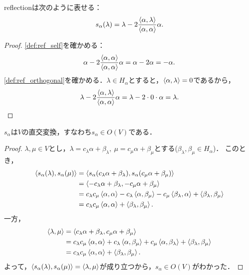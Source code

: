 \begin{proposition}
  reflectionは次のように表せる：
  \begin{equation}
    s_\alpha (\lambda) = \lambda - 2\frac{\left\langle \alpha, \lambda \right\rangle}{\left\langle \alpha, \alpha \right\rangle} \alpha.
  \end{equation}
\end{proposition}

\begin{proof}
  \ref{def:ref_self}を確かめる：
  \begin{equation}
    \alpha - 2 \frac{\left\langle \alpha, \alpha \right\rangle}{\left\langle \alpha, \alpha \right\rangle} \alpha
    = \alpha - 2\alpha
    = -\alpha.
  \end{equation}
  \ref{def:ref_orthogonal}を確かめる．$\lambda \in H_\alpha$とすると，$\left\langle \alpha, \lambda \right\rangle = 0$であるから，
  \begin{equation}
    \lambda - 2\frac{\left\langle \alpha, \lambda \right\rangle}{\left\langle \alpha, \alpha \right\rangle} \alpha
    = \lambda - 2 \cdot 0 \cdot \alpha
    = \lambda.
  \end{equation}
\end{proof}

\begin{proposition}
  $s_\alpha$は$V$の直交変換，すなわち$s_\alpha \in O(V)$である．
\end{proposition}

\begin{proof}
  $\lambda, \mu \in V$とし，$\lambda = c_\lambda \alpha + \beta_\lambda,\ \mu = c_\mu \alpha + \beta_\mu$とする($\beta_\lambda, \beta_\mu \in H_\alpha$)．
  このとき，
  \begin{align}
    \left\langle s_\alpha(\lambda), s_\alpha(\mu) \right\rangle
    &= \left\langle s_\alpha(c_\lambda \alpha + \beta_\lambda), s_\alpha(c_\mu \alpha + \beta_\mu) \right\rangle\\
    &= \left\langle -c_\lambda \alpha + \beta_\lambda, -c_\mu \alpha + \beta_\mu \right\rangle\\
    &= c_\lambda c_\mu \left\langle \alpha, \alpha \right\rangle - c_\lambda \left\langle \alpha, \beta_\mu \right\rangle - c_\mu \left\langle \beta_\lambda, \alpha \right\rangle + \left\langle \beta_\lambda, \beta_\mu \right\rangle\\
    &= c_\lambda c_\mu \left\langle \alpha, \alpha \right\rangle + \left\langle \beta_\lambda, \beta_\mu \right\rangle.
  \end{align}
  一方，
  \begin{align}
    \left\langle \lambda, \mu \right\rangle
    &= \left\langle c_\lambda \alpha + \beta_\lambda, c_\mu \alpha + \beta_\mu \right\rangle\\
    &= c_\lambda c_\mu \left\langle \alpha, \alpha \right\rangle + c_\lambda \left\langle \alpha, \beta_\mu \right\rangle + c_\mu \left\langle \alpha, \beta_\lambda \right\rangle + \left\langle \beta_\lambda, \beta_\mu \right\rangle\\
    &= c_\lambda c_\mu \left\langle \alpha, \alpha \right\rangle + \left\langle \beta_\lambda, \beta_\mu \right\rangle.
  \end{align}
  よって，$\left\langle s_\alpha(\lambda), s_\alpha(\mu) \right\rangle = \left\langle \lambda, \mu \right\rangle$が成り立つから，$s_\alpha \in O(V)$がわかった．
\end{proof}

